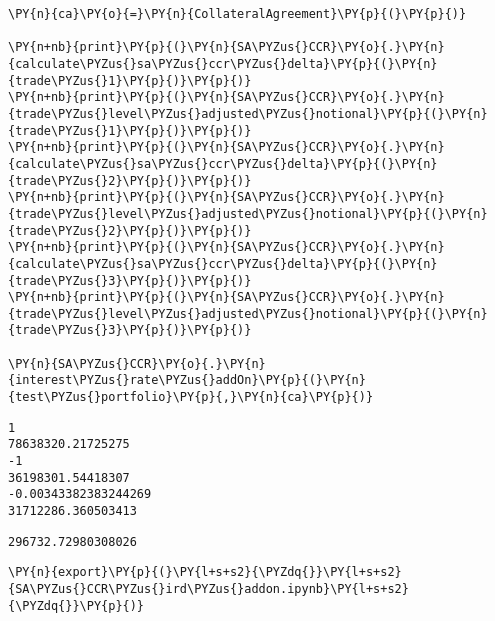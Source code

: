     
    \begin{tcolorbox}[breakable, size=fbox, boxrule=1pt, pad at break*=1mm,colback=cellbackground, colframe=cellborder]
\begin{Verbatim}[commandchars=\\\{\}]
\PY{n}{ca}\PY{o}{=}\PY{n}{CollateralAgreement}\PY{p}{(}\PY{p}{)}

\PY{n+nb}{print}\PY{p}{(}\PY{n}{SA\PYZus{}CCR}\PY{o}{.}\PY{n}{calculate\PYZus{}sa\PYZus{}ccr\PYZus{}delta}\PY{p}{(}\PY{n}{trade\PYZus{}1}\PY{p}{)}\PY{p}{)}
\PY{n+nb}{print}\PY{p}{(}\PY{n}{SA\PYZus{}CCR}\PY{o}{.}\PY{n}{trade\PYZus{}level\PYZus{}adjusted\PYZus{}notional}\PY{p}{(}\PY{n}{trade\PYZus{}1}\PY{p}{)}\PY{p}{)}
\PY{n+nb}{print}\PY{p}{(}\PY{n}{SA\PYZus{}CCR}\PY{o}{.}\PY{n}{calculate\PYZus{}sa\PYZus{}ccr\PYZus{}delta}\PY{p}{(}\PY{n}{trade\PYZus{}2}\PY{p}{)}\PY{p}{)}
\PY{n+nb}{print}\PY{p}{(}\PY{n}{SA\PYZus{}CCR}\PY{o}{.}\PY{n}{trade\PYZus{}level\PYZus{}adjusted\PYZus{}notional}\PY{p}{(}\PY{n}{trade\PYZus{}2}\PY{p}{)}\PY{p}{)}
\PY{n+nb}{print}\PY{p}{(}\PY{n}{SA\PYZus{}CCR}\PY{o}{.}\PY{n}{calculate\PYZus{}sa\PYZus{}ccr\PYZus{}delta}\PY{p}{(}\PY{n}{trade\PYZus{}3}\PY{p}{)}\PY{p}{)}
\PY{n+nb}{print}\PY{p}{(}\PY{n}{SA\PYZus{}CCR}\PY{o}{.}\PY{n}{trade\PYZus{}level\PYZus{}adjusted\PYZus{}notional}\PY{p}{(}\PY{n}{trade\PYZus{}3}\PY{p}{)}\PY{p}{)}

\PY{n}{SA\PYZus{}CCR}\PY{o}{.}\PY{n}{interest\PYZus{}rate\PYZus{}addOn}\PY{p}{(}\PY{n}{test\PYZus{}portfolio}\PY{p}{,}\PY{n}{ca}\PY{p}{)}
\end{Verbatim}
\end{tcolorbox}

    \begin{Verbatim}[commandchars=\\\{\}]
1
78638320.21725275
-1
36198301.54418307
-0.00343382383244269
31712286.360503413
    \end{Verbatim}

            \begin{tcolorbox}[breakable, size=fbox, boxrule=.5pt, pad at break*=1mm, opacityfill=0]
\begin{Verbatim}[commandchars=\\\{\}]
296732.72980308026
\end{Verbatim}
\end{tcolorbox}
        
    \begin{tcolorbox}[breakable, size=fbox, boxrule=1pt, pad at break*=1mm,colback=cellbackground, colframe=cellborder]
\begin{Verbatim}[commandchars=\\\{\}]
\PY{n}{export}\PY{p}{(}\PY{l+s+s2}{\PYZdq{}}\PY{l+s+s2}{SA\PYZus{}CCR\PYZus{}ird\PYZus{}addon.ipynb}\PY{l+s+s2}{\PYZdq{}}\PY{p}{)}
\end{Verbatim}
\end{tcolorbox}


